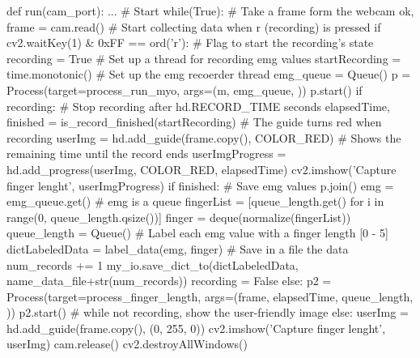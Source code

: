 \begin{python}[frame=none, numbers=left,label={data-recorder}, caption={El algoritmo implementado muestra una ventana con la imagen de la \textit{webcam}, cuando el usuario presiona la tecla \textbf{r}(línea 8) se crea un proceso (l. 15) que guarda los
valores que capta la Myo. Se puede diferenciar el ''modo grabación'' cuando la franja cambia de verde \ref{fig:not-recording} a rojo \ref{fig:recording-20} \ref{fig:recording-80} Al pasar un tiempo determinado (l. 19), se procede a recuperar los datos EMG (l.29) así como los de las etiquetas de longitud (l. 30-32). Estos datos son asociados (l.35) y guardados (l.38) }]
def run(cam_port):
...
# Start
while(True):
    # Take a frame form the webcam
    ok, frame = cam.read()
    # Start collecting data when r (recording) is pressed
    if cv2.waitKey(1) & 0xFF == ord('r'):
        # Flag to start the recording's state
        recording = True
        # Set up a thread for recording emg values
        startRecording = time.monotonic()
        # Set up the emg recoerder thread
        emg_queue = Queue()
        p = Process(target=process_run_myo, args=(m, emg_queue, ))
        p.start()
    if recording:
        # Stop recording after hd.RECORD_TIME seconds
        elapsedTime, finished = is_record_finished(startRecording)
        # The guide turns red when recording
        userImg = hd.add_guide(frame.copy(), COLOR_RED)
        # Shows the remaining time until the record ends
        userImgProgress = hd.add_progress(userImg, COLOR_RED,
                                          elapsedTime)
        cv2.imshow('Capture finger lenght', userImgProgress)
        if finished:
            # Save emg values
            p.join()
            emg = emg_queue.get()  # emg is a queue
            fingerList = [queue_length.get()
                             for i in range(0, queue_length.qsize())]
            finger = deque(normalize(fingerList))
            queue_length = Queue()
            # Label each emg value with a finger length [0 - 5]
            dictLabeledData = label_data(emg, finger)
            # Save in a file the data
            num_records += 1
            my_io.save_dict_to(dictLabeledData,
                               name_data_file+str(num_records))
            recording = False
        else:
            p2 = Process(target=process_finger_length,
                         args=(frame, elapsedTime, queue_length, ))
            p2.start()
    # while not recording, show the user-friendly image
    else:
        userImg = hd.add_guide(frame.copy(), (0, 255, 0))
        cv2.imshow('Capture finger lenght', userImg)
cam.release()
cv2.destroyAllWindows()

\end{python}



